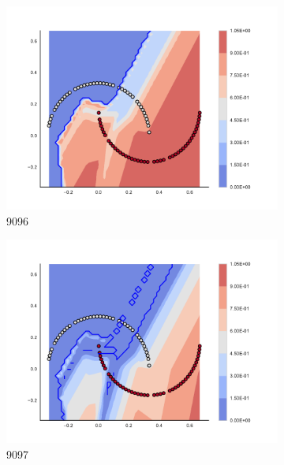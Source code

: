 \begin{figure}[h]
\begin{subfigure}[b]{0.09\textwidth}
    \includegraphics[clip, trim=2.35cm 1.75cm 4.5cm 0cm,width=\textwidth]{img/convergence/9096.pdf}
    \caption{9096}
    \label{fig:convergence_9096}
\end{subfigure}
%
\begin{subfigure}[b]{0.09\textwidth}
    \includegraphics[clip, trim=2.35cm 1.75cm 4.5cm 0cm,width=\textwidth]{img/convergence/9097.pdf}
    \caption{9097}
    \label{fig:convergence_9097}
\end{subfigure}
%
\begin{subfigure}[b]{0.09\textwidth}

\end{subfigure}
\end{figure}
